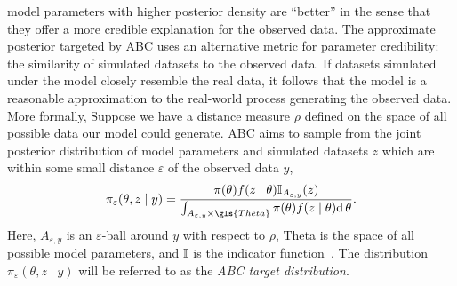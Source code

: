  model parameters with higher posterior density are ``better''
in the sense that they offer a more credible explanation for the observed data.
The approximate posterior targeted by \gls{ABC} uses an alternative metric for
parameter credibility: the similarity of simulated datasets to the observed
data. If datasets simulated under the model closely resemble the real data, it
follows that the model is a reasonable approximation to the real-world process
generating the observed data. More formally,  Suppose we have a distance measure $\rho$
defined on the space of all possible data our model could generate. \gls{ABC}
aims to sample from the joint posterior distribution of model parameters and
simulated datasets $z$ which are within some small distance $\varepsilon$ of
the observed data $y$,
\begin{align}
  \pi_{\varepsilon}(\theta, z \mid y) =
  \frac{\prior(\theta) \lik(z \mid \theta) \I_{A_{\varepsilon, y}} (z)}
  {\int_{A_{\varepsilon, y} \times \gls{Theta}} \prior(\theta) \lik(z \mid \theta) \d \theta}.
  \label{eq:abctarget}
\end{align}
Here, $A_{\varepsilon, y}$ is an $\varepsilon$-ball around $y$ with respect to
$\rho$, \gls{Theta} is the space of all possible model parameters, and $\mathbb{I}$ is
the indicator function~\autocite{marin2012approximate}. The distribution
$\pi_\varepsilon(\theta, z \mid y)$ will be referred to as the
\textit{\gls{ABC} target distribution}. 

